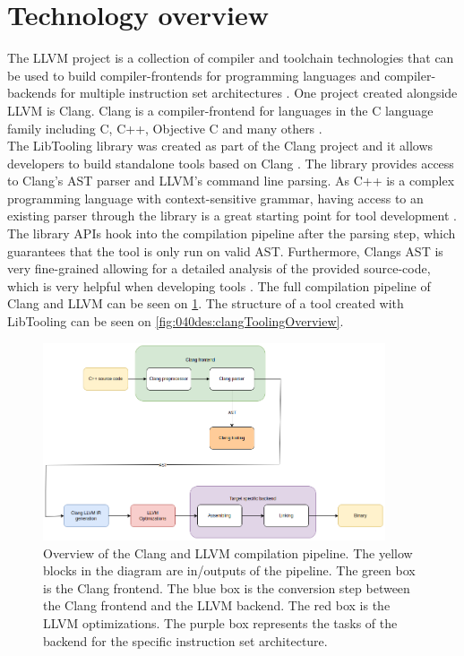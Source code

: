 \section{Technology overview}
The LLVM project is a collection of compiler and toolchain technologies that can be used to build compiler-frontends for programming languages and compiler-backends for multiple instruction set architectures \cite{llvmLLVMCompilerInfrastructure}.
One project created alongside LLVM is Clang. Clang is a compiler-frontend for languages in the C language family including C, C++, Objective C and many others \cite{clangClangLanguageFamily}.\\
The LibTooling library was created as part of the Clang project and it allows developers to build standalone tools based on Clang \cite{llvmLibToolingClang17}. 
The library provides access to Clang's AST parser and LLVM's command line parsing. As C++ is a complex programming language with context-sensitive grammar, having access to an existing parser through the library is a great starting point for tool development \cite{swarnimProblemsPainsParsing}. The library APIs hook into the compilation pipeline after the parsing step, which guarantees that the tool is only run on valid AST. Furthermore, Clangs AST is very fine-grained allowing for a detailed analysis of the provided source-code, which is very helpful when developing tools \cite{clangIntroductionClangAST}. The full compilation pipeline of Clang and LLVM can be seen on \cref{fig:040des:llvmToolchainOverview}. The structure of a tool created with LibTooling can be seen on \cref{fig:040des:clangToolingOverview}.

\begin{figure}[H]
    \centering
    \includegraphics[width=0.9\textwidth]{figs/040des/compilation_overview.png}
    \caption{Overview of the Clang and LLVM compilation pipeline. The yellow blocks in the diagram are in/outputs of the pipeline. The green box is the Clang frontend. The blue box is the conversion step between the Clang frontend and the LLVM backend. The red box is the LLVM optimizations. The purple box represents the tasks of the backend for the specific instruction set architecture.}
    \label{fig:040des:llvmToolchainOverview}
\end{figure}

